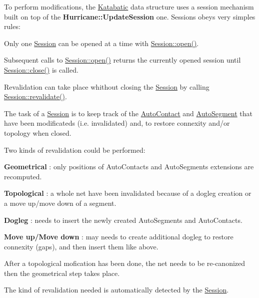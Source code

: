To perform modifications, the \hyperlink{namespaceKatabatic}{Katabatic} data structure uses a session mechanism built on top of the \textbf{ Hurricane\+::\+Update\+Session} one. Sessions obeys very simples rules\+:
\begin{DoxyItemize}
\item Only one \hyperlink{classKatabatic_1_1Session}{Session} can be opened at a time with \hyperlink{classKatabatic_1_1Session_a000e098850f6cccff6b289a294149a41}{Session\+::open()}.
\item Subsequent calls to \hyperlink{classKatabatic_1_1Session_a000e098850f6cccff6b289a294149a41}{Session\+::open()} returns the currently opened session until \hyperlink{classKatabatic_1_1Session_a5ae591df94fc66ccb85cbb6565368bca}{Session\+::close()} is called.
\item Revalidation can take place whithout closing the \hyperlink{classKatabatic_1_1Session}{Session} by calling \hyperlink{classKatabatic_1_1Session_a4da9e28432c1fdb0c754717487d9cc83}{Session\+::revalidate()}.
\end{DoxyItemize}

The task of a \hyperlink{classKatabatic_1_1Session}{Session} is to keep track of the \hyperlink{classKatabatic_1_1AutoContact}{Auto\+Contact} and \hyperlink{classKatabatic_1_1AutoSegment}{Auto\+Segment} that have been modificateds (i.\+e. invalidated) and, to restore connexity and/or topology when closed.

Two kinds of revalidation could be performed\+: 
\begin{DoxyItemize}
\item {\bfseries Geometrical} \+: only positions of Auto\+Contacts and Auto\+Segments extensions are recomputed. 
\item {\bfseries Topological} \+: a whole net have been invalidated because of a dogleg creation or a move up/move down of a segment. 
\begin{DoxyItemize}
\item {\bfseries Dogleg} \+: needs to insert the newly created Auto\+Segments and Auto\+Contacts. 
\item {\bfseries Move up/\+Move down} \+: may needs to create additional dogleg to restore connexity (gaps), and then insert them like above. 
\end{DoxyItemize}After a topological mofication has been done, the net needs to be re-\/canonized then the geometrical step takes place. 
\end{DoxyItemize}

The kind of revalidation needed is automatically detected by the \hyperlink{classKatabatic_1_1Session}{Session}.

